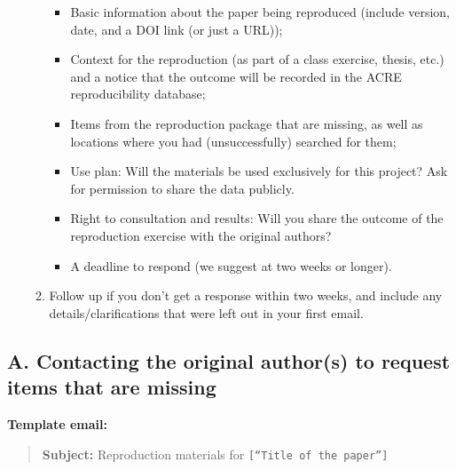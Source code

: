 \documentclass[]{book}
\providecommand{\tightlist}{%
  \setlength{\itemsep}{0pt}\setlength{\parskip}{0pt}}
\begin{document}
\begin{enumerate}
\begin{enumerate}
    \begin{itemize}
    \tightlist
    \item
      Basic information about the paper being reproduced (include version, date, and a DOI link (or just a URL));\\
    \item
      Context for the reproduction (as part of a class exercise, thesis, etc.) and a notice that the outcome will be recorded in the ACRE reproducibility database;\\
    \item
      Items from the reproduction package that are missing, as well as locations where you had (unsuccessfully) searched for them;\\
    \item
      Use plan: Will the materials be used exclusively for this project? Ask for permission to share the data publicly.\\
    \item
      Right to consultation and results: Will you share the outcome of the reproduction exercise with the original authors?\\
    \item
      A deadline to respond (we suggest at two weeks or longer).
    \end{itemize}
  \item
    Follow up if you don't get a response within two weeks, and include any details/clarifications that were left out in your first email.
  \end{enumerate}
\end{enumerate}

\hypertarget{a.-contacting-the-original-authors-to-request-items-that-are-missing}{%
\subsection{A. Contacting the original author(s) to request items that are missing}\label{a.-contacting-the-original-authors-to-request-items-that-are-missing}}

\textbf{Template email:}

\begin{quote}
\textbf{Subject:} Reproduction materials for \texttt{{[}“Title\ of\ the\ paper”{]}}
\end{quote}
\end{document}
